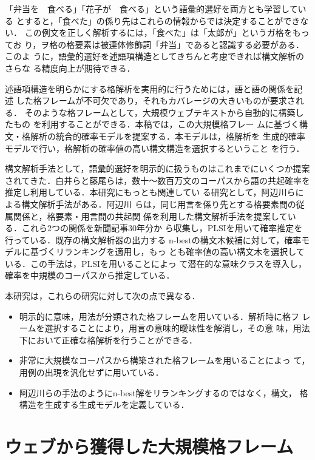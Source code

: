 \documentclass[japanese]{jnlp_1.3e}
\begin{document}
\noindent
「弁当を　食べる」「花子が　食べる」という語彙的選好を両方とも学習している
とすると，「食べた」の係り先はこれらの情報からでは決定することができない．
この例文を正しく解析するには，「食べた」は「太郎が」というガ格をもってお
り，ヲ格の格要素は被連体修飾詞「弁当」であると認識する必要がある．このよ
うに，語彙的選好を述語項構造としてきちんと考慮できれば構文解析のさらな
る精度向上が期待できる．

述語項構造を明らかにする格解析を実用的に行うためには，語と語の関係を記述
した格フレームが不可欠であり，それもカバレージの大きいものが要求される．
そのような格フレームとして，大規模ウェブテキストから自動的に構築したもの
を利用することができる\cite{Kawahara2006}．本稿では，この大規模格フレー
ムに基づく構文・格解析の統合的確率モデルを提案する．本モデルは，格解析を
生成的確率モデルで行い，格解析の確率値の高い構文構造を選択するということ
を行う．

構文解析手法として，語彙的選好を明示的に扱うものはこれまでにいくつか提案
されてきた．白井らと藤尾らは，数十〜数百万文のコーパスから語の共起確率を
推定し利用している\cite{Shirai1998,Fujio1999}．本研究にもっとも関連してい
る研究として，阿辺川らによる構文解析手法がある\cite{Abekawa2006}．阿辺川
らは，同じ用言を係り先とする格要素間の従属関係と，格要素・用言間の共起関
係を利用した構文解析手法を提案している．これら2つの関係を新聞記事30年分か
ら収集し，PLSIを用いて確率推定を行っている．既存の構文解析器の出力する
n-bestの構文木候補に対して，確率モデルに基づくリランキングを適用し，もっ
とも確率値の高い構文木を選択している．この手法は，PLSIを用いることによっ
て潜在的な意味クラスを導入し，確率を中規模のコーパスから推定している．

本研究は，これらの研究に対して次の点で異なる．
\begin{itemize}
 \item 明示的に意味，用法が分類された格フレームを用いている．解析時に格フ
       レームを選択することにより，用言の意味的曖昧性を解消し，その意
       味，用法下において正確な格解析を行うことができる．
 \item 非常に大規模なコーパスから構築された格フレームを用いることによっ
       て，用例の出現を汎化せずに用いている．
 \item 阿辺川らの手法のようにn-best解をリランキングするのではなく，構文，
       格構造を生成する生成モデルを定義している．
\end{itemize}


\section{ウェブから獲得した大規模格フレーム}
\label{Section::格フレーム辞書の自動構築}
\end{document}
